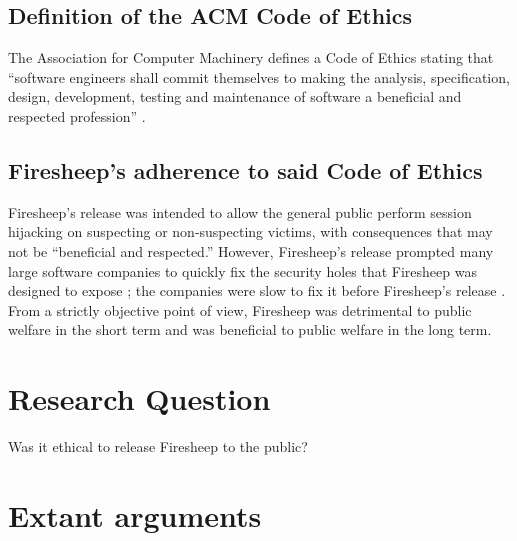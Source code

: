 \documentclass[12pt,twocolumn]{article}
\begin{document}
\subsection{Definition of the ACM Code of Ethics}
The Association for Computer Machinery defines a Code of Ethics stating that ``software engineers shall commit themselves to making the analysis, specification, design, development, testing and maintenance of software a beneficial and respected profession'' \cite{se-code}. 

\subsection{Firesheep's adherence to said Code of Ethics}
Firesheep's release was intended to allow the general public perform session hijacking on suspecting or non-suspecting victims, with consequences that may not be ``beneficial and respected.'' However, Firesheep's release prompted many large software companies to quickly fix the security holes that Firesheep was designed to expose \cite{disconnect-blog}; the companies were slow to fix it before Firesheep's release \cite{disconnect-blog}. From a strictly objective point of view, Firesheep was detrimental to public welfare in the short term and was beneficial to public welfare in the long term.


\section{Research Question}

Was it ethical to release Firesheep to the public?



\section{Extant arguments}
\end{document}
